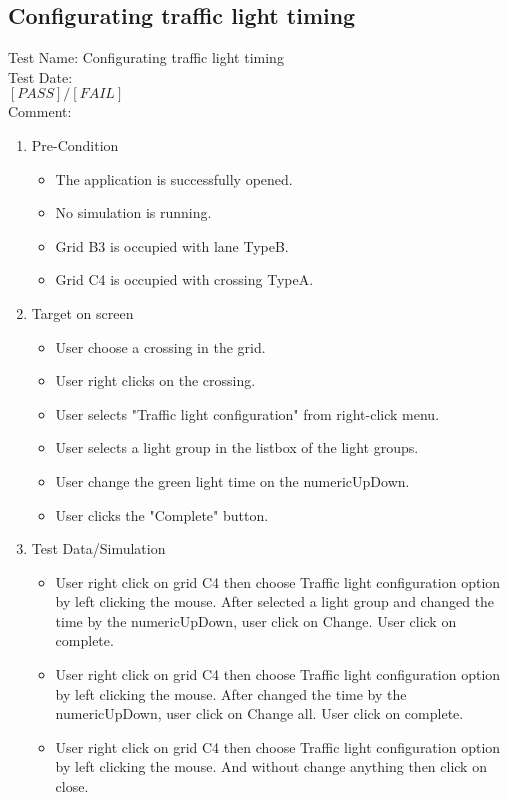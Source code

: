 \subsection{Configurating traffic light timing}
Test Name: Configurating traffic light timing\\Test Date: \\ $\left[ PASS \right] / \left[ FAIL \right]$\\Comment: \\
\begin{enumerate}
	\item Pre-Condition
	\begin{itemize}
		\item The application is successfully opened.
		\item No simulation is running.
		\item Grid B3 is occupied with lane TypeB.
		\item Grid C4 is occupied with crossing TypeA.
	\end{itemize}
	\item Target on screen
	\begin{itemize}
		\item User choose a crossing in the grid.
		\item User right clicks on the crossing.
		\item User selects "Traffic light configuration" from right-click menu.
		\item User selects a light group in the listbox of the light groups.
		\item User change the green light time on the numericUpDown.
		\item User clicks the "Complete" button. 
	\end{itemize}
	\item Test Data/Simulation
	\begin{itemize}
		\item User right click on grid C4 then choose Traffic light configuration  option by left clicking the mouse. After selected a light group and changed the time by the numericUpDown, user click on Change. User click on complete.
		\item User right click on grid C4 then choose Traffic light configuration option by left clicking the mouse. After changed the time by the numericUpDown, user click on Change all. User click on complete.
		\item User right click on grid C4 then choose Traffic light configuration option by left clicking the mouse. And without change anything then click on close. 

\end{itemize}
\end{enumerate}

